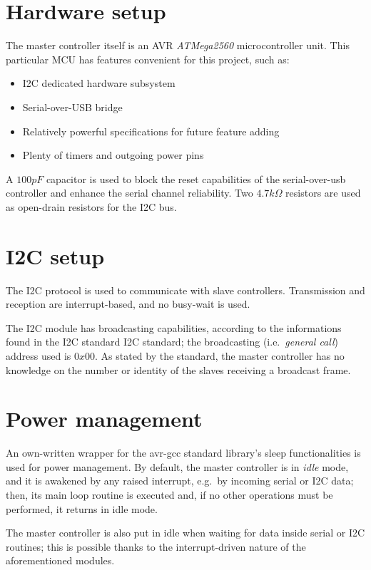 \documentclass[binding=0.6cm,Lau]{sapthesis}
\begin{document}
\section{Hardware setup}
The master controller itself is an AVR \emph{ATMega2560} microcontroller unit\cite{at2560-ref}.
This particular MCU has features convenient for this project, such as:
\begin{itemize}
  \item I2C dedicated hardware subsystem
  \item Serial-over-USB bridge
  \item Relatively powerful specifications for future feature adding
  \item Plenty of timers and outgoing power pins
\end{itemize}

A $100 pF$ capacitor is used to block the reset capabilities of the
serial-over-usb controller and enhance the serial channel reliability. Two
$4.7 k\Omega$ resistors are used as open-drain resistors for the I2C bus.

\section{I2C setup}
The I2C protocol is used to communicate with slave controllers. Transmission
and reception are interrupt-based, and no busy-wait is used.

The I2C module has broadcasting capabilities, according to the informations
found in the I2C standard I2C standard\cite{i2c-ref}; the broadcasting (i.e.\
\emph{general call}) address used is $0x00$. As stated by the standard, the
master controller has no knowledge on the number or identity of the slaves
receiving a broadcast frame.

\section{Power management}
An own-written wrapper for the avr-gcc standard library's sleep functionalities is used for power management.
By default, the master controller is in \emph{idle} mode, and it is awakened by
any raised interrupt, e.g.\ by incoming serial or I2C data; then, its main loop
routine is executed and, if no other operations must be performed, it returns
in idle mode.

The master controller is also put in idle when waiting for data inside serial
or I2C routines; this is possible thanks to the interrupt-driven nature of the
aforementioned modules.
\end{document}
